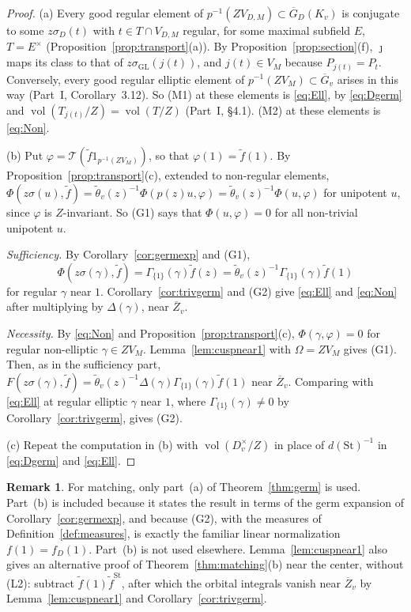 \documentclass[12pt]{article}
\newcommand{\ov}[1]{\overline{#1}}
\newcommand{\vol}{\operatorname{vol}}
\newcommand{\GL}{\mathrm{GL}}
\newcommand{\St}{\mathrm{St}}
\newcommand{\Gb}{\ov{G}}
\newcommand{\Zb}{\ov{Z}}
\newcommand{\GDb}{\ov{G}_D}
\newcommand{\jj}{\jmath}
\newcommand{\sg}{\sigma}
\theoremstyle{plain}
\theoremstyle{definition}
\newtheorem{remark}[theorem]{Remark}
\begin{document}
\begin{proof}
(a) Every good regular element of $p^{-1}(ZV_{D,M})\subset\GDb(K_v)$ is conjugate to some $z\sg_D(t)$ with $t\in T\cap V_{D,M}$ regular, for some maximal subfield $E$, $T=E^\times$ (Proposition~\ref{prop:transport}(a)). By Proposition~\ref{prop:section}(f), $\jj$ maps its class to that of $z\sg_{\GL}(j(t))$, and $j(t)\in V_M$ because $P_{j(t)}=P_t$. Conversely, every good regular elliptic element of $p^{-1}(ZV_M)\subset\Gb_v$ arises in this way (Part~I, Corollary~3.12). So (M1) at these elements is \eqref{eq:Ell}, by \eqref{eq:Dgerm} and $\vol(T_{j(t)}/Z)=\vol(T/Z)$ (Part~I, \S4.1). (M2) at these elements is \eqref{eq:Non}.

(b) Put $\varphi=\mathcal T(\tilde f1_{p^{-1}(ZV_M)})$, so that $\varphi(1)=\tilde f(1)$. By Proposition~\ref{prop:transport}(c), extended to non-regular elements, $\Phi(z\sg(u),\tilde f)=\tilde\theta_v(z)^{-1}\Phi(p(z)u,\varphi)=\tilde\theta_v(z)^{-1}\Phi(u,\varphi)$ for unipotent $u$, since $\varphi$ is $Z$-invariant. So (G1) says that $\Phi(u,\varphi)=0$ for all non-trivial unipotent $u$.

\emph{Sufficiency.} By Corollary~\ref{cor:germexp} and (G1), \[ \Phi(z\sg(\gamma),\tilde f)=\Gamma_{\{1\}}(\gamma)\tilde f(z)=\tilde\theta_v(z)^{-1}\Gamma_{\{1\}}(\gamma)\tilde f(1) \]
for regular $\gamma$ near $1$. Corollary~\ref{cor:trivgerm} and (G2) give \eqref{eq:Ell} and \eqref{eq:Non} after multiplying by $\Delta(\gamma)$, near $\Zb_v$.

\emph{Necessity.} By \eqref{eq:Non} and Proposition~\ref{prop:transport}(c), $\Phi(\gamma,\varphi)=0$ for regular non-elliptic $\gamma\in ZV_M$. Lemma~\ref{lem:cuspnear1} with $\Omega=ZV_M$ gives (G1). Then, as in the sufficiency part, $F(z\sg(\gamma),\tilde f)=\tilde\theta_v(z)^{-1}\Delta(\gamma)\Gamma_{\{1\}}(\gamma)\tilde f(1)$ near $\Zb_v$. Comparing with \eqref{eq:Ell} at regular elliptic $\gamma$ near $1$, where $\Gamma_{\{1\}}(\gamma)\ne0$ by Corollary~\ref{cor:trivgerm}, gives (G2).

(c) Repeat the computation in (b) with $\vol(D_v^\times/Z)$ in place of $d(\St)^{-1}$ in \eqref{eq:Dgerm} and \eqref{eq:Ell}.
\end{proof}

\begin{remark}
For matching, only part~(a) of Theorem~\ref{thm:germ} is used. Part~(b) is included because it states the result in terms of the germ expansion of Corollary~\ref{cor:germexp}, and because (G2), with the measures of Definition~\ref{def:measures}, is exactly the familiar linear normalization $f(1)=f_D(1)$. Part~(b) is not used elsewhere. Lemma~\ref{lem:cuspnear1} also gives an alternative proof of Theorem~\ref{thm:matching}(b) near the center, without (L2): subtract $\tilde f(1)\tilde f^{\St}$, after which the orbital integrals vanish near $\Zb_v$ by Lemma~\ref{lem:cuspnear1} and Corollary~\ref{cor:trivgerm}.
\end{remark}
\end{document}
